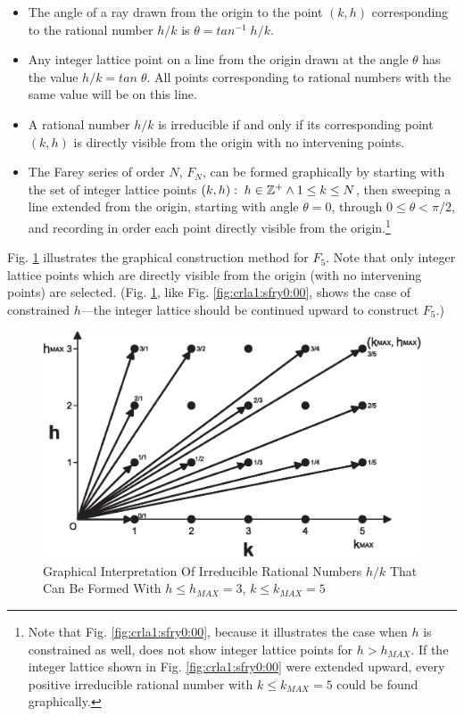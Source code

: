 \begin{itemize}
\item The angle of a ray drawn from the origin to the point $(k,h)$
      corresponding to the rational number $h/k$ is $\theta = tan^{-1} \; h/k$.
\item Any integer lattice point on a line from the origin drawn at the
      angle $\theta$ has the value $h/k = tan \; \theta$.  All points
      corresponding to rational numbers with the same value will be on this
      line.
\item A rational number $h/k$ is irreducible if and only if its
      corresponding point $(k,h)$ is directly visible from the origin with
      no intervening points.
\item The Farey series of order $N$, $F_N$, can be formed graphically by
      starting with the set of integer lattice points $(k,h): \; h \in
      {\mathbb{Z}^+} \wedge 1 \leq k \leq N$, then sweeping a line extended
      from the origin, starting with angle $\theta = 0$, through $0 \leq \theta
      < \pi{}/2$, and recording in order each point directly visible from the
      origin.\footnote{Note that Fig.  \ref{fig:crla1:sfry0:00}, because
      it illustrates the case when $h$ is constrained as well, does not show
      integer lattice points for $h > h_{MAX}$.  If the integer
      lattice shown in Fig.  \ref{fig:crla1:sfry0:00} were extended
      upward, every positive irreducible rational number with
      $k \leq k_{MAX} = 5$ could be found graphically.}
\end{itemize}

Fig.  \ref{fig:crla1:sfry0:01} illustrates the graphical construction
method for $F_5$.  Note that only integer lattice points which are
directly visible from the origin (with no intervening points) are
selected.  (Fig.  \ref{fig:crla1:sfry0:01}, like Fig.
\ref{fig:crla1:sfry0:00}, shows the case of constrained $h$---the integer
lattice should be continued upward to construct $F_5$.)

\begin{figure}
\centering
\includegraphics[width=4.6in]{c_rla1/farey01b.eps}
\caption{Graphical Interpretation Of Irreducible Rational Numbers
         $h/k$ That Can Be Formed With $h \leq h_{MAX}=3$, $k \leq k_{MAX}=5$}
\label{fig:crla1:sfry0:01}
\end{figure}

